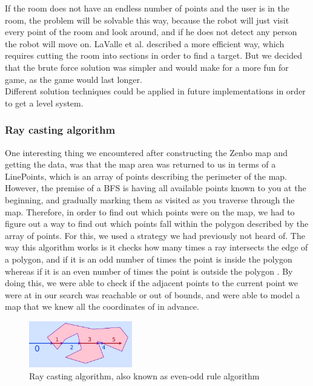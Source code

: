 \documentclass[conference]{IEEEtran}
\begin{document}
If the room does not have an endless number of points and the user is in the room, 
the problem will be solvable this way, because the robot will just visit every point of the room and look around, and 
if he does not detect any person the robot will move on.
LaValle et al. \cite{b3} described a more efficient way, which requires cutting the room into sections in order to find a target.
But we decided that the brute force solution was simpler and would make for a more fun for game, as the game would last longer.\\
Different solution techniques could be applied in future implementations in order to get a level system.
\subsubsection{Ray casting algorithm} \label{sec:raycasting}
One interesting thing we encountered after constructing the Zenbo map and getting the data, was that the map area was returned to us in terms of a LinePoints, which is an array of points describing the perimeter of the map. 
However, the premise of a BFS is having all available points known to you at the beginning, and gradually marking them as visited as you traverse through the map. 
Therefore, in order to find out which points were on the map, we had to figure out a way to find out which points fall within the polygon described by the array of points. 
For this, we used a strategy we had previously not heard of. The way this algorithm works is it checks how many times a ray intersects the edge of a polygon, and if it is an odd number of times the point is inside the polygon whereas if it is an even number of times the point is outside the polygon \cite{b7}. 
By doing this, we were able to check if the adjacent points to the current point we were at in our search was reachable or out of bounds, and were able to model a map that we knew all the coordinates of in advance.
\begin{figure}[h]  \label{fig:raycasting}
	\begin{center}
		\includegraphics[width=0.4\textwidth]{pics/raycasting.png}
	\end{center}
	\caption{Ray casting algorithm, also known as even-odd rule algorithm}
\end{figure}
\end{document}
